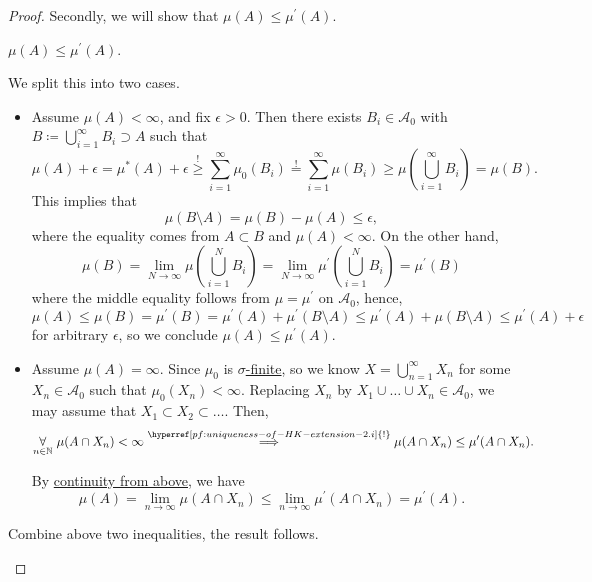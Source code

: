 \begin{proof}
	Secondly, we will show that \(\mu (A)\leq \mu ^\prime (A)\).
	\begin{claim}
		\(\mu (A)\leq \mu ^\prime (A)\).
	\end{claim}
	\begin{explanation}
		We split this into two cases.
		\begin{itemize}
			\item \label{pf:uniqueness-of-HK-extension-2.i}Assume \(\mu (A)<\infty \), and fix \(\epsilon >0\). Then there exists \(B_{i}\in\mathcal{A} _0\) with \(B\coloneqq \bigcup\limits_{i=1}^{\infty} B_{i}\supset A\)
			      such that
			      \[
				      \mu (A)+\epsilon = \mu ^{*} (A) + \epsilon\overset{\hyperref[prop:outer-measure]{!}}{\geq} \sum\limits_{i=1}^{\infty} \mu _0(B_{i}) \overset{\hyperref[def:pre-measure-countable-additivity-within-the-algebra]{!}}{=} \sum\limits_{i=1}^{\infty} \mu (B_{i})\geq \mu \left(\bigcup\limits_{i=1}^{\infty} B_{i}\right) = \mu (B).
			      \]
			      This implies that
			      \[
				      \mu (B\setminus A) = \mu (B) - \mu (A)\leq \epsilon,
			      \]
			      where the equality comes from \(A\subset B\) and \(\mu (A)<\infty \). On the other hand,
			      \[
				      \mu (B) = \lim\limits_{N \to \infty} \mu \left(\bigcup\limits_{i=1}^{N} B_{i}\right) = \lim\limits_{N \to \infty} \mu ^\prime \left(\bigcup\limits_{i=1}^{N} B_{i}\right) = \mu ^\prime (B)
			      \]
			      where the middle equality follows from \(\mu  = \mu ^\prime \) on \(\mathcal{A} _0\), hence,
			      \[
				      \mu (A)\leq \mu (B) = \mu ^\prime (B) = \mu ^\prime (A)+\mu ^\prime (B\setminus A) \leq \mu ^\prime (A) + \mu (B\setminus A) \leq \mu ^\prime (A) + \epsilon
			      \]
			      for arbitrary \(\epsilon \), so we conclude \(\mu (A)\leq \mu ^\prime (A)\).
			\item Assume \(\mu (A) = \infty \). Since \(\mu _0\) is \hyperref[def:finite-measure]{\(\sigma \)-finite}, so we know \(X = \bigcup\limits_{n=1}^{\infty} X_{n}\) for some \(X_{n}\in\mathcal{A} _0\) such that
			      \(\mu _0(X_{n})<\infty\).  Replacing \(X_{n}\) by \(X_{1}\cup \ldots \cup X_{n} \in\mathcal{A} _0\), we may assume that \(X_1 \subset X_2 \subset \ldots\).
			      Then,
			      \[
				      \underset{n\in\mathbb{\MakeUppercase{N}} }{\forall}\ \mu (A \cap X_{n})<\infty\overset{\hyperref[pf:uniqueness-of-HK-extension-2.i]{!}}{\implies} \mu (A\cap X_{n})\leq \mu ^\prime (A\cap X_{n}).
			      \]

			      By \hyperref[thm:measure-space-continuity-from-above]{continuity from above}, we have
			      \[
				      \mu (A) = \lim\limits_{n \to \infty} \mu (A\cap X_{n})\leq \lim\limits_{n \to \infty} \mu ^\prime (A\cap X_{n}) = \mu ^\prime (A).
			      \]
		\end{itemize}
		Combine above two inequalities, the result follows.
	\end{explanation}
\end{proof}


